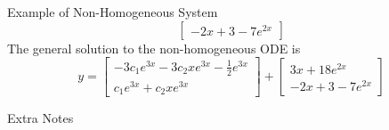 \documentclass{article}
\begin{document}
\begin{multicols*}{3}
\begin{blackbox}{Example of Non-Homogeneous System}
{\[\begin{bmatrix}
                -2x+3 - 7e^{2x}
            \end{bmatrix}  
        \]
        The general solution to the non-homogeneous ODE is 
        \[
            y = \begin{bmatrix}
                -3c_1e^{3x} - 3c_2xe^{3x} - \frac{1}{2}e^{3x}\\
                c_1e^{3x} + c_2xe^{3x}
            \end{bmatrix}
            + \begin{bmatrix}
                3x + 18e^{2x}\\
                -2x+3 - 7e^{2x}
            \end{bmatrix}
        \]
    }
\end{blackbox}
\begin{blackbox}{Extra Notes}
    \hspace{300pt}
    \vspace{557pt}
\end{blackbox}
\end{multicols*}
\end{document}
